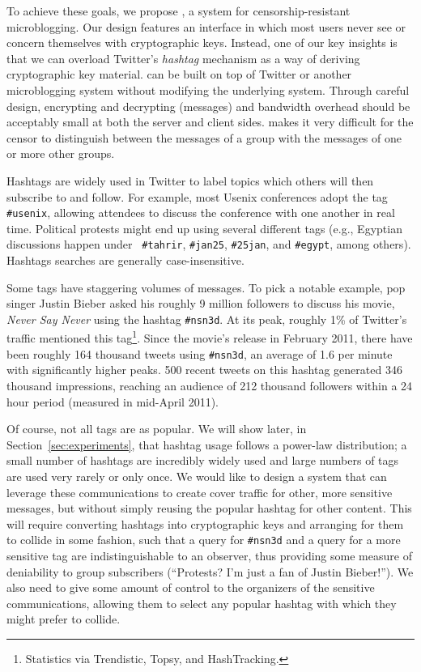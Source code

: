To achieve these goals, we propose \hoot, a system for
censorship-resistant microblogging. Our design features an interface in
which most users never see or concern themselves with cryptographic
keys. Instead, one of our key insights is that we can overload Twitter's
{\em hashtag} mechanism as a way of deriving cryptographic key
material. \hoot can be built on top of Twitter or another microblogging
system without modifying the underlying system. Through careful design,
encrypting and decrypting \msgs (\hoot messages) and bandwidth overhead
should be acceptably small at both the server and client sides. 
\hoot makes it very difficult for the censor to distinguish between the
messages of a group with the messages of one or more other groups.


Hashtags are widely used in Twitter to label topics which others will
then subscribe to and follow. For example, most Usenix conferences adopt
the tag {\tt \#usenix}, allowing attendees to discuss the conference
with one another in real time. Political protests might end up using
several different tags (e.g., Egyptian discussions happen under {\tt
  \#tahrir}, {\tt \#jan25}, {\tt \#25jan}, and {\tt \#egypt}, among
others). Hashtags searches are generally case-insensitive.

Some tags have staggering volumes of messages. To pick a notable example, pop singer Justin Bieber asked his roughly 9 million followers to discuss his movie, {\em Never Say Never} using the hashtag {\tt \#nsn3d}. At its peak, roughly 1\% of Twitter's traffic mentioned this tag\footnote{Statistics via Trendistic, Topsy, and HashTracking.}. Since the movie's release in February 2011, there have been roughly 164 thousand tweets using {\tt \#nsn3d}, an average of 1.6 per minute with significantly higher peaks. 500 recent tweets on this hashtag generated 346 thousand impressions, reaching an audience of 212 thousand followers within a 24 hour period (measured in mid-April 2011). 

Of course, not all tags are as popular. We will show later, in Section~\ref{sec:experiments}, that hashtag usage follows a power-law distribution; a small number of hashtags are incredibly widely used and large numbers of tags are used very rarely or only once. We would like to design a system that can leverage these communications to create cover traffic for other, more sensitive messages, but without simply reusing the popular hashtag for other content. This will require converting hashtags into cryptographic keys and arranging for them to collide in some fashion, such that a query for {\tt \#nsn3d} and a query for a more sensitive tag are indistinguishable to an observer, thus providing some measure of deniability to group subscribers (``Protests? I'm just a fan of Justin Bieber!''). We also need to give some amount of control to the organizers of the sensitive communications, allowing them to select any popular hashtag with which they might prefer to collide.

